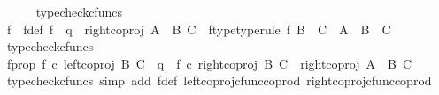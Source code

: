 \begin{isabellebody}
\ \ \ \ \isamarkupfalse%
\ typecheck{\isacharunderscore}{\kern0pt}cfuncs\ \ \isanewline
\ \ \isamarkupfalse%
\ f\ \ f{\isacharunderscore}{\kern0pt}def{\isacharcolon}{\kern0pt}\ {\isachardoublequoteopen}f\ {\isacharequal}{\kern0pt}\ q\ {\isasymamalg}\ {\isacharparenleft}{\kern0pt}right{\isacharunderscore}{\kern0pt}coproj\ {\isacharparenleft}{\kern0pt}A\ {\isasymCoprod}\ B{\isacharparenright}{\kern0pt}\ C{\isacharparenright}{\kern0pt}{\isachardoublequoteclose}\ \ f{\isacharunderscore}{\kern0pt}type{\isacharbrackleft}{\kern0pt}type{\isacharunderscore}{\kern0pt}rule{\isacharbrackright}{\kern0pt}{\isacharcolon}{\kern0pt}\ {\isachardoublequoteopen}{\isacharparenleft}{\kern0pt}f{\isacharcolon}{\kern0pt}\ {\isacharparenleft}{\kern0pt}B\ {\isasymCoprod}\ C{\isacharparenright}{\kern0pt}\ {\isasymrightarrow}\ {\isacharparenleft}{\kern0pt}{\isacharparenleft}{\kern0pt}A\ {\isasymCoprod}\ B{\isacharparenright}{\kern0pt}\ {\isasymCoprod}\ C{\isacharparenright}{\kern0pt}{\isacharparenright}{\kern0pt}{\isachardoublequoteclose}\isanewline
\ \ \ \ \isamarkupfalse%
\ typecheck{\isacharunderscore}{\kern0pt}cfuncs\isanewline
\ \ \isamarkupfalse%
\ f{\isacharunderscore}{\kern0pt}prop{\isacharcolon}{\kern0pt}\ {\isachardoublequoteopen}{\isacharparenleft}{\kern0pt}f\ {\isasymcirc}\isactrlsub c\ left{\isacharunderscore}{\kern0pt}coproj\ B\ C\ {\isacharequal}{\kern0pt}\ q{\isacharparenright}{\kern0pt}\ {\isasymand}\ {\isacharparenleft}{\kern0pt}f\ {\isasymcirc}\isactrlsub c\ right{\isacharunderscore}{\kern0pt}coproj\ B\ C\ {\isacharequal}{\kern0pt}\ right{\isacharunderscore}{\kern0pt}coproj\ {\isacharparenleft}{\kern0pt}A\ {\isasymCoprod}\ B{\isacharparenright}{\kern0pt}\ C{\isacharparenright}{\kern0pt}{\isachardoublequoteclose}\isanewline
\ \ \ \ \isamarkupfalse%
\ {\isacharparenleft}{\kern0pt}typecheck{\isacharunderscore}{\kern0pt}cfuncs{\isacharcomma}{\kern0pt}\ simp\ add{\isacharcolon}{\kern0pt}\ f{\isacharunderscore}{\kern0pt}def\ left{\isacharunderscore}{\kern0pt}coproj{\isacharunderscore}{\kern0pt}cfunc{\isacharunderscore}{\kern0pt}coprod\ right{\isacharunderscore}{\kern0pt}coproj{\isacharunderscore}{\kern0pt}cfunc{\isacharunderscore}{\kern0pt}coprod{\isacharparenright}{\kern0pt}\isanewline
\ \ \isamarkupfalse%
\ \isamarkupfalse%

\end{isabellebody}
